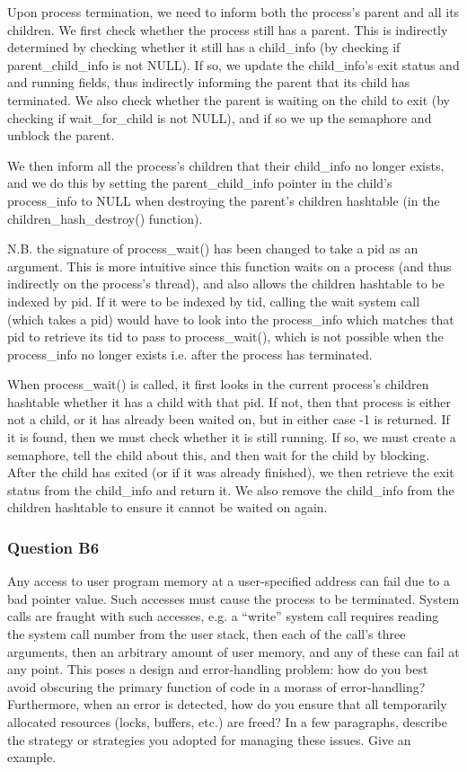 Upon process termination, we need to inform both the process's parent and all its children. We first check whether the process still has a parent. This is indirectly determined by checking whether it still has a child\_info (by checking if parent\_child\_info is not NULL). If so, we update the child\_info's exit status and and running fields, thus indirectly informing the parent that its child has terminated. We also check whether the parent is waiting on the child to exit (by checking if wait\_for\_child is not NULL), and if so we up the semaphore and unblock the parent.

We then inform all the process's children that their child\_info no longer exists, and we do this by setting the parent\_child\_info pointer in the child's process\_info to NULL when destroying the parent's children hashtable (in the children\_hash\_destroy() function).

N.B. the signature of process\_wait() has been changed to take a pid as an argument. This is more intuitive since this function waits on a process (and thus indirectly on the process's thread), and also allows the children hashtable to be indexed by pid. If it were to be indexed by tid, calling the wait system call (which takes a pid) would have to look into the process\_info which matches that pid to retrieve its tid to pass to process\_wait(), which is not possible when the process\_info no longer exists i.e. after the process has terminated.

When process\_wait() is called, it first looks in the current process's children hashtable whether it has a child with that pid. If not, then that process is either not a child, or it has already been waited on, but in either case -1 is returned. If it is found, then we must check whether it is still running. If so, we must create a semaphore, tell the child about this, and then wait for the child by blocking. After the child has exited (or if it was already finished), we then retrieve the exit status from the child\_info and return it. We also remove the child\_info from the children hashtable to ensure it cannot be waited on again.

\subsubsection*{Question B6} %
Any access to user program memory at a user-specified address can fail due to a bad pointer value.  Such accesses must cause the process to be terminated.  System calls are fraught with such accesses, e.g. a ``write'' system call requires reading the system call number from the user stack, then each of the call's three arguments, then an arbitrary amount of user memory, and any of these can fail at any point.  This poses a design and error-handling problem: how do you best avoid obscuring the primary function of code in a morass of error-handling?  Furthermore, when an error is detected, how do you ensure that all temporarily allocated resources (locks, buffers, etc.) are freed?  In a few paragraphs, describe the strategy or strategies you adopted for managing these issues.  Give an example.

